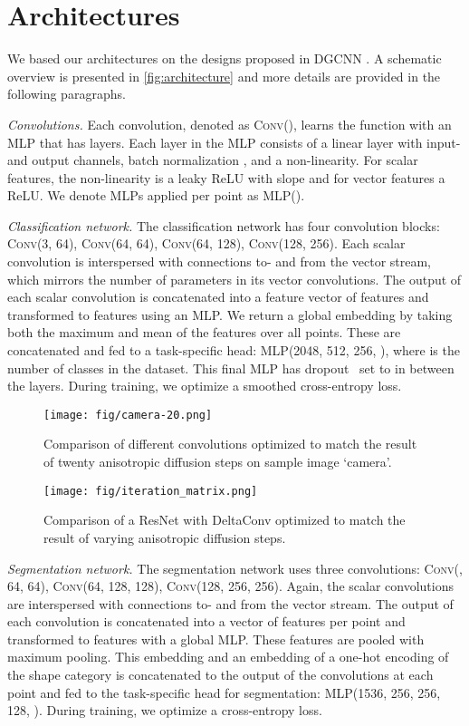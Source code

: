 \documentclass[acmtog, authorversion]{acmart}
\begin{document}
\section{Architectures}
We based our architectures on the designs proposed in DGCNN \cite{Wang2019}. A schematic overview is presented in \autoref{fig:architecture} and more details are provided in the following paragraphs.

\emph{Convolutions.} Each convolution, denoted as \textsc{Conv}(), learns the function  with an MLP that has  layers. Each layer in the MLP consists of a linear layer with  input- and  output channels, batch normalization \cite{Ioffe2015}, and a non-linearity. For scalar features, the non-linearity is a leaky ReLU with slope  and for vector features a ReLU. We denote MLPs applied per point as \textsc{MLP}().

\emph{Classification network.} The classification network has four convolution blocks: \textsc{Conv}(3, 64), \textsc{Conv}(64, 64), \textsc{Conv}(64, 128),  \textsc{Conv}(128, 256). Each scalar convolution is interspersed with connections to- and from the vector stream, which mirrors the number of parameters in its vector convolutions. The output of each scalar convolution is concatenated into a feature vector of  features and transformed to  features using an MLP. We return a global embedding by taking both the maximum and mean of the features over all points. These are concatenated and fed to a task-specific head: \textsc{MLP}(2048, 512, 256, ), where  is the number of classes in the dataset. This final MLP has dropout~\cite{dropout2014} set to  in between the layers. During training, we optimize a smoothed cross-entropy loss.

\begin{figure}
    \centering
    \texttt{[image: fig/camera-20.png]}
    \caption{Comparison of different convolutions optimized to match the result of twenty anisotropic diffusion steps on sample image `camera'.}
    \label{fig:peronamalik_camera}
\end{figure}

\begin{figure}
    \centering
    \texttt{[image: fig/iteration\_matrix.png]}
    \caption{Comparison of a ResNet with DeltaConv optimized to match the result of varying anisotropic diffusion steps.}
    \label{fig:peronamalik_nsteps}
\end{figure}

\emph{Segmentation network.} The segmentation network uses three convolutions: \textsc{Conv}(, 64, 64), \textsc{Conv}(64, 128, 128),
\textsc{Conv}(128, 256, 256). Again, the scalar convolutions are interspersed with connections to- and from the vector stream. The output of each convolution is concatenated into a vector of  features per point and transformed to  features with a global MLP. These features are pooled with maximum pooling. This embedding and an embedding of a one-hot encoding of the shape category is concatenated to the output of the convolutions at each point and fed to the task-specific head for segmentation: \textsc{MLP}(1536, 256, 256, 128, ). During training, we optimize a cross-entropy loss.
\end{document}
